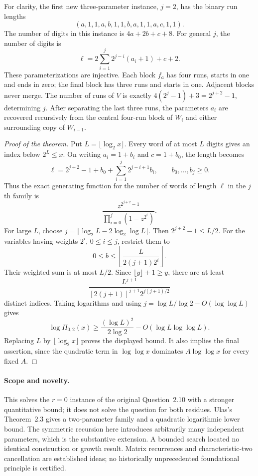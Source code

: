 \documentclass[11pt,a4paper]{article}
\theoremstyle{definition}
\theoremstyle{remark}
\begin{document}
For clarity, the first new three-parameter instance, $j=2$, has the binary
run lengths
\[
 (a,1,1,a,b,1,1,b,a,1,1,a,c,1,1).
\]
The number of digits in this instance is $4a+2b+c+8$.
For general $j$, the number of digits is
\[
 \ell=2\sum_{i=1}^j2^{j-i}(a_i+1)+c+2.
\]
These parameterizations are injective. Each block $f_a$ has four runs,
starts in one and ends in zero; the final block has three runs and starts
in one. Adjacent blocks never merge. The number of runs of $V$ is exactly
$4(2^j-1)+3=2^{j+2}-1$, determining $j$. After separating the last three
runs, the parameters $a_i$ are recovered recursively from the central
four-run block of $W_i$ and either surrounding copy of $W_{i-1}$.

\begin{proof}[Proof of the theorem]
Put $L=\lfloor\log_2x\rfloor$. Every word of at most $L$ digits gives an
index below $2^L\le x$. On writing $a_i=1+b_i$ and $c=1+b_0$, the length
becomes
\[
 \ell=2^{j+2}-1+b_0+\sum_{i=1}^j2^{j-i+1}b_i,
 \qquad b_0,\ldots,b_j\ge0.
\]
Thus the exact generating function for the number of words of length
$\ell$ in the $j$th family is
\[
 \frac{z^{2^{j+2}-1}}{\prod_{i=0}^j(1-z^{2^i})}.
\]
For large $L$, choose
$j=\lfloor\log_2L-2\log_2\log L\rfloor$. Then $2^{j+2}-1\le L/2$.
For the variables having weights $2^i$, $0\le i\le j$, restrict them to
\[
 0\le b\le\left\lfloor\frac{L}{2(j+1)2^i}\right\rfloor.
\]
Their weighted sum is at most $L/2$. Since $\lfloor y\rfloor+1\ge y$,
there are at least
\[
 \frac{L^{j+1}}{[2(j+1)]^{j+1}2^{j(j+1)/2}}
\]
distinct indices. Taking logarithms and using
$j=\log L/\log2-O(\log\log L)$ gives
\[
 \log\Pi_{0,2}(x)\ge
 \frac{(\log L)^2}{2\log2}-O(\log L\log\log L).
\]
Replacing $L$ by $\lfloor\log_2x\rfloor$ proves the displayed bound.
It also implies the final assertion, since the quadratic term in
$\log\log x$ dominates $A\log\log x$ for every fixed $A$.
\end{proof}

\paragraph{Scope and novelty.}
This solves the $r=0$ instance of the original Question~2.10 with a stronger
quantitative bound; it does not solve the question for both residues.
Ulas's Theorem~2.3 gives a two-parameter family and a quadratic logarithmic
lower bound. The symmetric recursion here introduces arbitrarily many
independent parameters, which is the substantive extension. A bounded
search located no identical construction or growth result. Matrix
recurrences and characteristic-two cancellation are established ideas;
no historically unprecedented foundational principle is certified.
\end{document}
